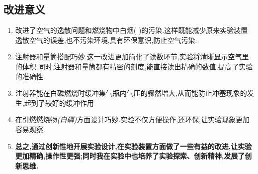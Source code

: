 \documentclass[11pt,a4paper,titlepage,twocolumn]{ctexart}
\begin{document}
	\subsection{改进意义}
	
	\begin{enumerate}
		\item 改进了空气的逸散问题和燃烧物中白烟( )的污染.这样既能减少原来实验装置逸散空气的误差,也不污染环境,具有环保意识,防止空气污染.
		\item 注射器和量筒搭配巧妙.这一改进更加简化了读数环节,实验将清晰显示空气里 的体积.同时,注射器和量筒都有精密的刻度,能直接读出精确的数值,提高了实验的准确性.
		\item 注射器能在白磷燃烧时缓冲集气瓶内气压的骤然增大,从而能防止冲塞现象的发生,起到了较好的缓冲作用
		\item 在引燃燃烧物\textit{(白磷)}方面设计巧妙.实验不仅方便操作,还环保,让实验现象更加容易观察.
		\item \textbf{总之,通过创新性地开展实验设计,在实验装置方面做了一些有益的改进,让实验更加精确,操作性更强;同时我在实验中也培养了实验探索、创新精神,发展了创新思维.}
	\end{enumerate}
	
\end{document}
